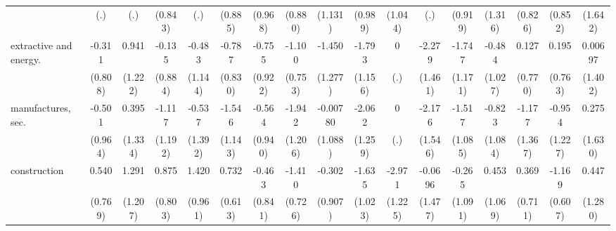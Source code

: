 {\begin{tabular}{l*{16}{c}}
                    &         (.)         &         (.)         &     (0.843)         &         (.)         &     (0.885)         &     (0.968)         &     (0.880)         &     (1.131)         &     (0.989)         &     (1.044)         &         (.)         &     (0.919)         &     (1.316)         &     (0.826)         &     (0.852)         &     (1.642)         \\
[1em]
extractive and energy.&      -0.311         &       0.941         &      -0.135         &      -0.483         &      -0.787         &      -0.755         &      -1.100         &      -1.450         &      -1.793         &           0         &      -2.279         &      -1.747         &      -0.484         &       0.127         &       0.195         &     0.00697         \\
                    &     (0.808)         &     (1.222)         &     (0.884)         &     (1.144)         &     (0.830)         &     (0.922)         &     (0.753)         &     (1.277)         &     (1.156)         &         (.)         &     (1.461)         &     (1.171)         &     (1.027)         &     (0.770)         &     (0.763)         &     (1.402)         \\
[1em]
manufactures, sec.  &      -0.501         &       0.395         &      -1.117         &      -0.537         &      -1.546         &      -0.564         &      -1.942         &    -0.00780         &      -2.062         &           0         &      -2.176         &      -1.517         &      -0.823         &      -1.177         &      -0.954         &       0.275         \\
                    &     (0.964)         &     (1.334)         &     (1.192)         &     (1.392)         &     (1.143)         &     (0.940)         &     (1.206)         &     (1.088)         &     (1.259)         &         (.)         &     (1.546)         &     (1.085)         &     (1.084)         &     (1.367)         &     (1.227)         &     (1.630)         \\
[1em]
construction        &       0.540         &       1.291         &       0.875         &       1.420         &       0.732         &      -0.463         &      -1.410         &      -0.302         &      -1.635         &      -2.971\sym{*}  &     -0.0696         &      -0.265         &       0.453         &       0.369         &      -1.169         &       0.447         \\
                    &     (0.769)         &     (1.207)         &     (0.803)         &     (0.961)         &     (0.613)         &     (0.841)         &     (0.726)         &     (0.907)         &     (1.023)         &     (1.225)         &     (1.477)         &     (1.091)         &     (1.069)         &     (0.711)         &     (0.607)         &     (1.280)         \\

\end{tabular}}
